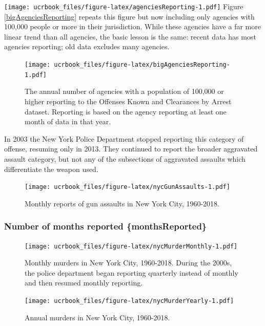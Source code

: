 \documentclass[
  12pt,
  openany]{book}
\begin{document}
\texttt{[image: ucrbook\_files/figure-latex/agenciesReporting-1.pdf]}
Figure \ref{bigAgenciesReporting} repeats this figure but now including only agencies with 100,000 people or more in their jurisdiction. While these agencies have a far more linear trend than all agencies, the basic lesson is the same: recent data has most agencies reporting; old data excludes many agencies.

\begin{figure}
\centering
\texttt{[image: ucrbook\_files/figure-latex/bigAgenciesReporting-1.pdf]}
\caption{\label{fig:bigAgenciesReporting}The annual number of agencies with a population of 100,000 or higher reporting to the Offenses Known and Clearances by Arrest dataset. Reporting is based on the agency reporting at least one month of data in that year.}
\end{figure}

In 2003 the New York Police Department stopped reporting this category of offense, resuming only in 2013. They continued to report the broader aggravated assault category, but not any of the subsections of aggravated assaults which differentiate the weapon used.

\begin{figure}
\centering
\texttt{[image: ucrbook\_files/figure-latex/nycGunAssaults-1.pdf]}
\caption{\label{fig:nycGunAssaults}Monthly reports of gun assaults in New York City, 1960-2018.}
\end{figure}

\hypertarget{number-of-months-reported-monthsreported}{%
\subsubsection{Number of months reported \{monthsReported\}}\label{number-of-months-reported-monthsreported}}

\begin{figure}
\centering
\texttt{[image: ucrbook\_files/figure-latex/nycMurderMonthly-1.pdf]}
\caption{\label{fig:nycMurderMonthly}Monthly murders in New York City, 1960-2018. During the 2000s, the police department began reporting quarterly instead of monthly and then resumed monthly reporting.}
\end{figure}

\begin{figure}
\centering
\texttt{[image: ucrbook\_files/figure-latex/nycMurderYearly-1.pdf]}
\caption{\label{fig:nycMurderYearly}Annual murders in New York City, 1960-2018.}
\end{figure}
\end{document}
